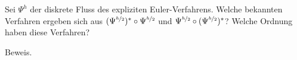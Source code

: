 \begin{exercise}
  Sei $\Psi^h$ der diskrete Fluss des expliziten Euler-Verfahrens. Welche bekannten
  Verfahren ergeben sich aus $(\Psi^{\nicefrac{h}{2}})^*\circ\Psi^{\nicefrac{h}{2}}$
  und $\Psi^{\nicefrac{h}{2}}\circ(\Psi^{\nicefrac{h}{2}})^*$? Welche Ordnung
  haben diese Verfahren?
\end{exercise}

\begin{solution}
Beweis.
\end{solution}
